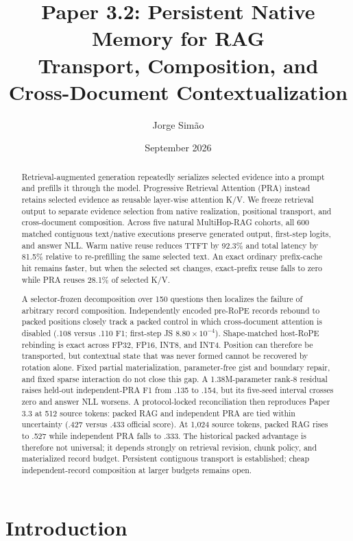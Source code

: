 \documentclass[11pt]{article}
\title{Paper 3.2: Persistent Native Memory for RAG\\
\large Transport, Composition, and Cross-Document Contextualization}
\author{Jorge Sim\~ao}
\date{September 2026}
\begin{document}
\maketitle

\begin{abstract}
Retrieval-augmented generation repeatedly serializes selected evidence into a
prompt and prefills it through the model. Progressive Retrieval Attention
(PRA) instead retains selected evidence as reusable layer-wise attention K/V.
We freeze retrieval output to separate evidence selection from native
realization, positional transport, and cross-document composition. Across five
natural MultiHop-RAG cohorts, all 600 matched contiguous text/native executions
preserve generated output, first-step logits, and answer NLL. Warm native reuse
reduces TTFT by 92.3\% and total latency by 81.5\% relative to re-prefilling the
same selected text. An exact ordinary prefix-cache hit remains faster, but when
the selected set changes, exact-prefix reuse falls to zero while PRA reuses
28.1\% of selected K/V.

A selector-frozen decomposition over 150 questions then localizes the failure
of arbitrary record composition. Independently encoded pre-RoPE records rebound
to packed positions closely track a packed control in which cross-document
attention is disabled (.108 versus .110 F1; first-step JS
$8.80\times10^{-4}$). Shape-matched host-RoPE rebinding is exact across FP32,
FP16, INT8, and INT4. Position can therefore be transported, but contextual
state that was never formed cannot be recovered by rotation alone. Fixed
partial materialization, parameter-free gist and boundary repair, and fixed
sparse interaction do not close this gap. A 1.38M-parameter rank-8 residual
raises held-out independent-PRA F1 from .135 to .154, but its five-seed
interval crosses zero and answer NLL worsens. A protocol-locked reconciliation
then reproduces Paper 3.3 at 512 source tokens: packed RAG and independent PRA
are tied within uncertainty (.427 versus .433 official score). At 1,024 source
tokens, packed RAG rises to .527 while independent PRA falls to .333. The
historical packed advantage is therefore not universal; it depends strongly on
retrieval revision, chunk policy, and materialized record budget. Persistent
contiguous transport is established; cheap independent-record composition at
larger budgets remains open.
\end{abstract}

\section{Introduction}
\end{document}
